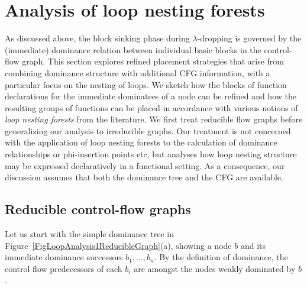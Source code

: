 \newcommand{\entrynode}[0]{\ensuremath{\mathbf{entry}}}
\newcommand{\exitnode}[0]{\ensuremath{\mathbf{exit}}}
\section{Analysis of loop nesting forests}
\label{sec:part1:semantics:LNF}
As discussed above, the block sinking phase during $\lambda$-dropping
is governed by the (immediate) dominance relation between individual
basic blocks in the control-flow graph. This section explores refined
placement strategies that arise from combining dominance structure
with additional CFG information, with a particular focus on the
nesting of loops. We sketch how the blocks of function declarations
for the immediate dominatees of a node can be refined and how the
resulting groups of functions can be placed in accordance with various
notions of \emph{loop nesting forests} from the literature. We first
treat reducible flow graphs before generalizing our analysis to
irreducible graphs.  Our treatment is not concerned with the
application of loop nesting forests to the calculation of dominance
relationships or phi-insertion points etc, but analyses how loop
nesting structure may be expressed declaratively in a functional
setting. As a consequence, our discussion assumes that both the
dominance tree and the CFG are available.

\subsection{Reducible control-flow graphs}
\label{sec:part1:semantics:LNF:reducible}
Let us start with the simple dominance tree in
Figure~\ref{FigLoopAnalysis1ReducibleGraph}(a), showing a node $b$ and
its immediate dominance successors $b_1, \ldots, b_n$.  By the
definition of dominance, the control flow predecessors of each $b_i$
are amongst the nodes weakly dominated by $b$.


